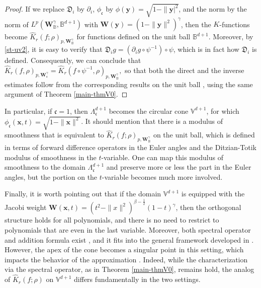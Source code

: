 \documentclass{amsart}
\theoremstyle{remark}
\def\fc{{\mathfrak c}}
\def\fD{{\mathfrak D}}
\def\b{{\beta}}
\def\g{{\gamma}}
\def\xb{{\mathbf x}}
\def\yb{{\mathbf y}}
\def\Wb{{\mathbf W}}
\def\BB{{\mathbb B}}
\def\VV{{\mathbb V}}
\newcommand{\wh}{\widehat}
\def\f{\frac}
\begin{document}
\begin{proof}
If we replace $\fD_i$ by $\partial_i$, $\phi_\fc$ by $\phi(\yb) = \sqrt{1-\|\yb|^2}$, and the norm by
the norm of $L^p(\Wb_\BB^\g, \BB^{d+1})$ with $\Wb(\yb) = (1-\|\yb\|^2)^\g$, then the $K$-functions 
become $\wh K_r(f; \rho)_{p, \Wb_\BB^\g}$ for functions defined on the unit ball $\BB^{d+1}$. Moreover, 
by \eqref{st-uv2}, it is easy to verify that $\fD_i g = \left(\partial_i g\circ \psi^{-1} \right) \circ \psi$, which is
in fact how $\fD_i$ is defined. Consequently, we can conclude that 
$
   \wh K_r(f, \rho)_{p,\Wb_{\fc}^\g} 
       = \wh K_r( f\circ \psi^{-1}, \rho)_{p,\Wb_\BB^\g},
$
so that both the direct and the inverse estimates follow from the corresponding results on the unit ball 
\cite[Theorem 6.6]{DaiX1}, using the same argument of Theorem \ref{main-thmV0}. 
\end{proof}

In particular, if $\fc =1$, then $\Lambda_\fc^{d+1}$ becomes the circular cone $\VV^{d+1}$, for which 
$\phi_\fc (\xb,t) = \sqrt{1-\|\xb\|^2}$. It should mention that there is a modulus of smoothness that is 
equivalent to $\wh K_r(f; \rho)_{p,\Wb_\BB^\g}$ on the unit ball, which is defined in terms of 
forward difference operators in the Euler angles and the Ditzian-Totik modulus of smoothness in
the $t$-variable. One can map this modulus of smoothness to the domain $\Lambda_\fc^{d+1}$ and 
preserve more or less the part in the Euler angles, but the portion on the $t$-variable becomes much
more involved. 

Finally, it is worth pointing out that if the domain $\VV^{d+1}$ is equipped with the Jacobi weight 
$\Wb(\xb,t) = (t^2-\|x\|^2)^{\b-\f12} (1-t)^\g$, then the orthogonal structure holds for all polynomials,
and there is no need to restrict to polynomials that are even in the last variable. Moreover, both
spectral operator and addition formula exist \cite{X20}, and it fits into the general framework developed
in \cite{X21}. However, the apex of the cone becomes a singular point in this setting, which impacts 
the behavior of the approximation \cite{GX}. Indeed, while the characterization via the spectral operator, 
as in Theorem \ref{main-thmV0}, remains hold, the analog of $\wh K_r(f; \rho)$ on $\VV^{d+1}$ differs 
fundamentally in the two settings. 
\end{document}
